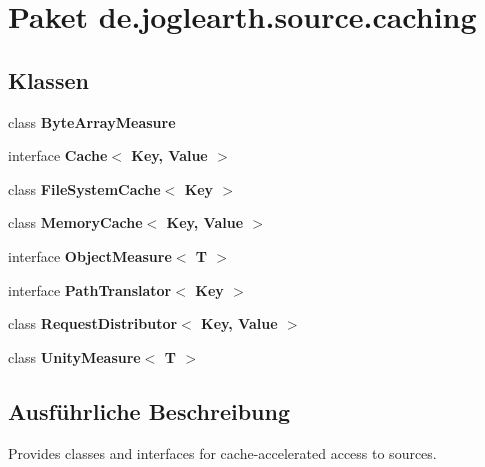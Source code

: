 \section{Paket de.\-joglearth.\-source.\-caching}
\label{namespacede_1_1joglearth_1_1source_1_1caching}
\subsection*{Klassen}
\begin{DoxyCompactItemize}
\item 
class {\bf Byte\-Array\-Measure}
\item 
interface {\bf Cache$<$ Key, Value $>$}
\item 
class {\bf File\-System\-Cache$<$ Key $>$}
\item 
class {\bf Memory\-Cache$<$ Key, Value $>$}
\item 
interface {\bf Object\-Measure$<$ T $>$}
\item 
interface {\bf Path\-Translator$<$ Key $>$}
\item 
class {\bf Request\-Distributor$<$ Key, Value $>$}
\item 
class {\bf Unity\-Measure$<$ T $>$}
\end{DoxyCompactItemize}


\subsection{Ausführliche Beschreibung}
Provides classes and interfaces for cache-\/accelerated access to sources. 